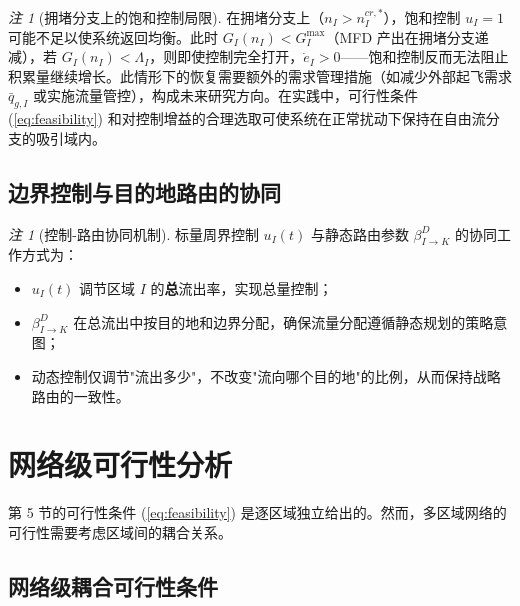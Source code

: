 \documentclass[a4paper,12pt]{article}
\theoremstyle{plain}
\theoremstyle{definition}
\theoremstyle{remark}
\newtheorem{remark}[theorem]{注}
\begin{document}
\begin{remark}[拥堵分支上的饱和控制局限]\label{rem:congested_saturation}
在拥堵分支上（$n_I > n_I^{cr,*}$），饱和控制 $u_I = 1$ 可能不足以使系统返回均衡。此时 $G_I(n_I) < G_I^{\max}$（MFD 产出在拥堵分支递减），若 $G_I(n_I) < \Lambda_I$，则即使控制完全打开，$\dot{e}_I > 0$——饱和控制反而无法阻止积累量继续增长。此情形下的恢复需要额外的需求管理措施（如减少外部起飞需求 $\bar{q}_{g,I}$ 或实施流量管控），构成未来研究方向。在实践中，可行性条件 (\ref{eq:feasibility}) 和对控制增益的合理选取可使系统在正常扰动下保持在自由流分支的吸引域内。
\end{remark}

\subsection{边界控制与目的地路由的协同}

\begin{remark}[控制-路由协同机制]\label{rem:control_routing}
标量周界控制 $u_I(t)$ 与静态路由参数 $\beta_{I \to K}^D$ 的协同工作方式为：
\begin{itemize}
    \item $u_I(t)$ 调节区域 $I$ 的\textbf{总}流出率，实现总量控制；
    \item $\beta_{I \to K}^D$ 在总流出中按目的地和边界分配，确保流量分配遵循静态规划的策略意图；
    \item 动态控制仅调节"流出多少"，不改变"流向哪个目的地"的比例，从而保持战略路由的一致性。
\end{itemize}
\end{remark}

\section{网络级可行性分析}

第 5 节的可行性条件 (\ref{eq:feasibility}) 是逐区域独立给出的。然而，多区域网络的可行性需要考虑区域间的耦合关系。

\subsection{网络级耦合可行性条件}
\end{document}
